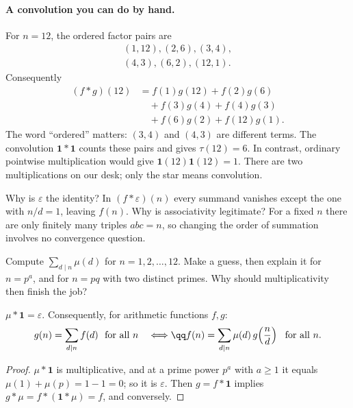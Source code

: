 \paragraph{A convolution you can do by hand.}
For $n=12$, the ordered factor pairs are
\[
\begin{gathered}
(1,12),(2,6),(3,4),\\
(4,3),(6,2),(12,1).
\end{gathered}
\]
Consequently
\[
\begin{aligned}
 (f*g)(12)&=f(1)g(12)+f(2)g(6)\\
 &\quad+f(3)g(4)+f(4)g(3)\\
 &\quad+f(6)g(2)+f(12)g(1).
\end{aligned}
\]
The word ``ordered'' matters: $(3,4)$ and $(4,3)$ are different terms.
The convolution $\mathbf1*\mathbf1$ counts these pairs and gives
$\tau(12)=6$. In contrast, ordinary pointwise multiplication would give
$\mathbf1(12)\mathbf1(12)=1$. There are two multiplications on our desk;
only the star means convolution.

Why is $\varepsilon$ the identity? In $(f*\varepsilon)(n)$ every summand
vanishes except the one with $n/d=1$, leaving $f(n)$. Why is associativity
legitimate? For a fixed $n$ there are only finitely many triples $abc=n$,
so changing the order of summation involves no convergence question.

\begin{think}
Compute $\sum_{d\mid n}\mu(d)$ for $n=1,2,\dots,12$. Make a guess, then explain it for $n=p^a$, and for $n=pq$ with two distinct primes. Why should multiplicativity then finish the job?
\end{think}

\begin{theorem}\label{thm:mobius}
$\mu*\mathbf 1=\varepsilon$. Consequently, for arithmetic functions $f,g$:
\[
\begin{gathered}g(n)=\sum_{d\mid n}f(d)\ \text{ for all }n\quad\Longleftrightarrow\qq f(n)=\sum_{d\mid n}\mu(d)\,g\!\left(\frac nd\right)\ \text{ for all }n.\end{gathered}
\]
\end{theorem}
\begin{proof}
$\mu*\mathbf 1$ is multiplicative, and at a prime power $p^a$ with $a\ge1$ it equals $\mu(1)+\mu(p)=1-1=0$; so it is $\varepsilon$. Then $g=f*\mathbf 1$ implies $g*\mu=f*(\mathbf 1*\mu)=f$, and conversely.
\end{proof}

